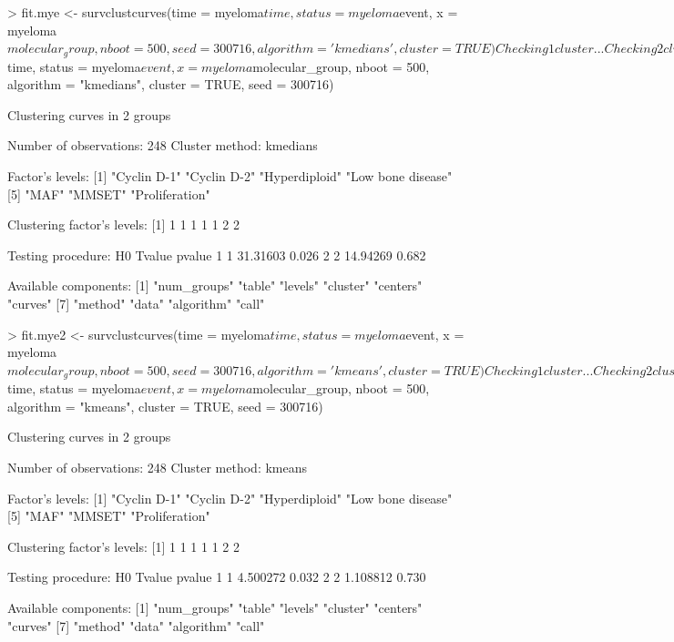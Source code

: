 \begin{example}
> fit.mye <- survclustcurves(time = myeloma$time, status = myeloma$event, 
                      x = myeloma$molecular_group, nboot = 500, seed = 300716,
                      algorithm = 'kmedians', cluster = TRUE)
Checking 1 cluster... 
Checking 2 clusters... 

Finally, there are 2 clusters. 
> summary(fit.mye)

Call:  
survclustcurves(time = myeloma$time, status = myeloma$event, 
    x = myeloma$molecular_group, nboot = 500, algorithm = "kmedians", 
    cluster = TRUE, seed = 300716)

Clustering curves in 2 groups

Number of observations:  248
Cluster method:  kmedians 

Factor's levels:
[1] "Cyclin D-1"       "Cyclin D-2"       "Hyperdiploid"     "Low bone disease"
[5] "MAF"              "MMSET"            "Proliferation"   

Clustering factor's levels:
[1] 1 1 1 1 1 2 2

Testing procedure:
  H0   Tvalue pvalue
1  1 31.31603  0.026
2  2 14.94269  0.682

Available components:
 [1] "num_groups" "table"      "levels"     "cluster"    "centers"    "curves"    
 [7] "method"     "data"       "algorithm"  "call"       

> fit.mye2 <- survclustcurves(time = myeloma$time, status = myeloma$event, 
                      x = myeloma$molecular_group, nboot = 500, seed = 300716,
                      algorithm = 'kmeans', cluster = TRUE)
Checking 1 cluster... 
Checking 2 clusters... 

Finally, there are 2 clusters. 





> summary(fit.mye2)

Call:  
survclustcurves(time = myeloma$time, status = myeloma$event, 
    x = myeloma$molecular_group, nboot = 500, algorithm = "kmeans", 
    cluster = TRUE, seed = 300716)

Clustering curves in 2 groups

Number of observations:  248
Cluster method:  kmeans 

Factor's levels:
[1] "Cyclin D-1"       "Cyclin D-2"       "Hyperdiploid"     "Low bone disease"
[5] "MAF"              "MMSET"            "Proliferation"   

Clustering factor's levels:
[1] 1 1 1 1 1 2 2

Testing procedure:
  H0   Tvalue pvalue
1  1 4.500272  0.032
2  2 1.108812  0.730

Available components:
 [1] "num_groups" "table"      "levels"     "cluster"    "centers"    "curves"    
 [7] "method"     "data"       "algorithm"  "call"   
\end{example} 



